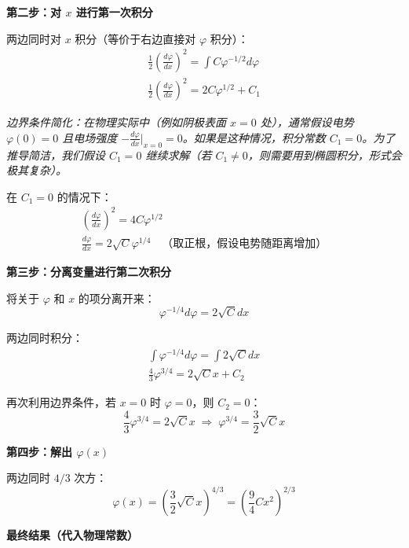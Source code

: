   \medskip
  \textbf{第二步：对 $x$ 进行第一次积分}

  两边同时对 $x$ 积分（等价于右边直接对 $\varphi$ 积分）：
  \begin{gather}
    \frac{1}{2} \left( \frac{d\varphi}{dx} \right)^2 = \int C \varphi^{-1/2} d\varphi \\
    \frac{1}{2} \left( \frac{d\varphi}{dx} \right)^2 = 2C \varphi^{1/2} + C_1
  \end{gather}

  \textit{边界条件简化：在物理实际中（例如阴极表面 $x=0$ 处），通常假设电势 $\varphi(0) = 0$ 且电场强度 $-\frac{d\varphi}{dx} \big|_{x=0} = 0$。如果是这种情况，积分常数 $C_1 = 0$。为了推导简洁，我们假设 $C_1 = 0$ 继续求解（若 $C_1 \neq 0$，则需要用到椭圆积分，形式会极其复杂）。}

  在 $C_1 = 0$ 的情况下：
  \begin{gather}
    \left( \frac{d\varphi}{dx} \right)^2 = 4C \varphi^{1/2} \\
    \frac{d\varphi}{dx} = 2\sqrt{C} \varphi^{1/4} \quad \text{（取正根，假设电势随距离增加）}
  \end{gather}

  \medskip
  \textbf{第三步：分离变量进行第二次积分}

  将关于 $\varphi$ 和 $x$ 的项分离开来：
  \begin{equation}
    \varphi^{-1/4} d\varphi = 2\sqrt{C} dx
  \end{equation}

  两边同时积分：
  \begin{gather}
    \int \varphi^{-1/4} d\varphi = \int 2\sqrt{C} dx \\
    \frac{4}{3} \varphi^{3/4} = 2\sqrt{C} x + C_2
  \end{gather}

  再次利用边界条件，若 $x=0$ 时 $\varphi=0$，则 $C_2 = 0$：
  \begin{equation}
    \frac{4}{3} \varphi^{3/4} = 2\sqrt{C} x \;\Longrightarrow\; \varphi^{3/4} = \frac{3}{2}\sqrt{C} x
  \end{equation}

  \medskip
  \textbf{第四步：解出 $\varphi(x)$}

  两边同时 $4/3$ 次方：
  \begin{equation}
    \varphi(x) = \left( \frac{3}{2}\sqrt{C} x \right)^{4/3} = \left(\frac{9}{4} C x^2 \right)^{2/3}
  \end{equation}

  \medskip
  \textbf{最终结果（代入物理常数）}

